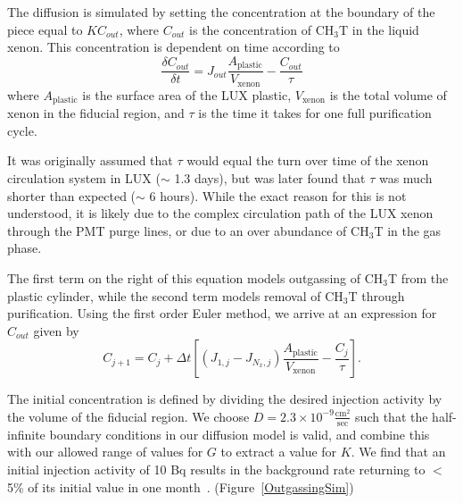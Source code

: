The diffusion is simulated by setting the concentration at the boundary of the piece equal to $KC_{out}$, where $C_{out}$ is the concentration of CH$_3$T in the liquid xenon. This concentration is dependent on time according to
\begin{equation}
\frac{\delta C_{out}}{\delta t} = J_{out} \frac{A_{\text{plastic}}}{V_{\text{xenon}}}-\frac{C_{out}}{\tau}
\end{equation}
where $A_{\text{plastic}}$ is the surface area of the LUX plastic, $V_{\text{xenon}}$ is the total volume of xenon in the fiducial region, and $\tau$ is the time it takes for one full purification cycle. 

It was originally assumed that $\tau$ would equal the turn over time of the xenon circulation system in LUX ($\sim$ 1.3 days), but was later found that $\tau$ was much shorter than expected ($\sim$ 6 hours).  While the exact reason for this is not understood, it is likely due to the complex circulation path of the LUX xenon through the PMT purge lines, or due to an over abundance of CH$_3$T in the gas phase.

The first term on the right of this equation models outgassing of CH$_3$T from the plastic cylinder, while the second term models removal of CH$_3$T through purification. Using the first order Euler method, we arrive at an expression for $C_{out}$ given by
\begin{equation}
C_{j+1}=C_j + \Delta t \left[\left( J_{1,j}-J_{N_x,j}\right) \frac{A_{\text{plastic}}}{V_{\text{xenon}}} - \frac{C_j}{\tau} \right].
\end{equation}

The initial concentration is defined by dividing the desired injection activity by the volume of the fiducial region. We choose $D = 2.3 \times 10^{-9} \frac{\text{cm}^2}{\text{sec}}$ such that the
half-infinite boundary conditions in our diffusion model is valid, and combine this with our allowed range of values for $G$ to extract a value for $K$. We find that an initial injection activity of 10 Bq results in the background rate returning to $<$ 5\% of its initial value in one month~\cite{JonOutgassing}. (Figure~\ref{OutgassingSim})

